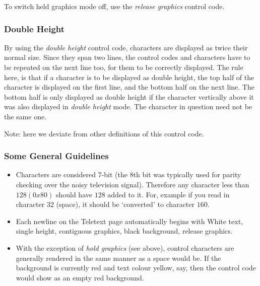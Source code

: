 To switch held graphics mode off, use the {\it release graphics} control code.

\subsubsection*{Double Height}

By using the {\it double height} control code, characters are displayed as twice their
normal size. Since they span two lines, the control codes and characters
have to be repeated on the next line too, for them to be correctly displayed.
The rule here, is that if a character is to be displayed as double height, the top half
of the character is displayed on the first line, and the bottom half on the next line.
The bottom half is only displayed as double height if the character vertically above it was
also displayed in {\it double height} mode. The character in question need not be the same one.

Note: here we deviate from other definitions of this control code.

\subsubsection*{Some General Guidelines}

\begin{itemize}
\item Characters are considered 7-bit (the 8th bit was typically used for parity
checking over the noisy television signal). Therefore any character less
than $128 (0x80)$ should have $128$ added to it. For, example if you
read in character  $32$ (space), it should be `converted' to character $160$.
\item Each newline on the Teletext page automatically begins with
White text, single height, contiguous graphics, black background, release graphics.
\item With the exception of {\it hold graphics} (see above), control characters are generally rendered in the same manner as a space would
be. If the background is currently red and text colour yellow, say, then the control code would show as an empty red background.
\end{itemize}
